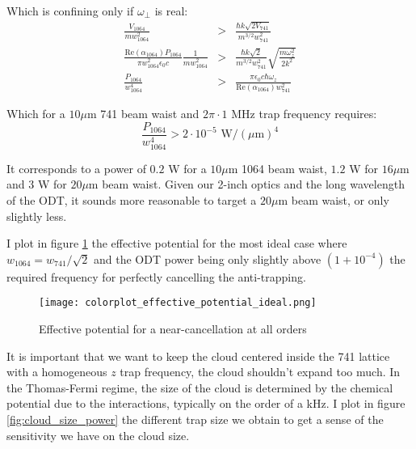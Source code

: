 \documentclass[reprint,amsmath,amssymb,aps,nofootinbib]{revtex4-1}
\begin{document}
Which is confining only if $\omega_{\perp}$ is real:
\begin{equation}
\begin{array}{rll}
\frac{V_{1064}}{mw_{1064}^{2}} &>& \frac{\hbar k\sqrt{2V_{741}}}{m^{3/2}w_{741}^{2}}\\[10pt]
\frac{\text{Re}(\alpha_{1064})P_{1064}}{\pi w_{1064}^{2}\epsilon_{0}c}\frac{1}{mw_{1064}^{2}} &>& \frac{\hbar k\sqrt{2}}{m^{3/2}w_{741}^{2}}\sqrt{\frac{m\omega_{z}^{2}}{2k^{2}}}\\[10pt]
\frac{P_{1064}}{w_{1064}^{4}} &>& \frac{\pi\epsilon_{0}c\hbar\omega_{z}}{\text{Re}(\alpha_{1064})w_{741}^{2}}
\end{array}
\end{equation}

Which for a $10\mu$m 741 beam waist and $2\pi\cdot 1\text{ MHz}$ trap frequency requires:
\begin{equation}
\frac{P_{1064}}{w_{1064}^{4}} > 2\cdot10^{-5}\text{ W}/(\mu\text{m})^{4}
\end{equation}

It corresponds to a power of $0.2$ W for a $10\mu$m 1064 beam waist, $1.2$ W for $16\mu$m and $3$ W for $20\mu$m beam waist. Given our 2-inch optics and the long wavelength of the ODT, it sounds more reasonable to target a $20\mu$m beam waist, or only slightly less.

I plot in figure \ref{fig:ideal_case} the effective potential for the most ideal case where $w_{1064} = w_{741}/\sqrt{2}$ and the ODT power being only slightly above $(1+10^{-4})$ the required frequency for perfectly cancelling the anti-trapping.

\begin{figure}
\begin{center}
\centering
\texttt{[image: colorplot\_effective\_potential\_ideal.png]}
\caption{\label{fig:ideal_case}Effective potential for a near-cancellation at all orders}
\end{center}
\end{figure}

It is important that we want to keep the cloud centered inside the 741 lattice with a homogeneous $z$ trap frequency, the cloud shouldn't expand too much. In the Thomas-Fermi regime, the size of the cloud is determined by the chemical potential due to the interactions, typically on the order of a kHz. I plot in figure \ref{fig:cloud_size_power} the different trap size we obtain to get a sense of the sensitivity we have on the cloud size.
\end{document}
